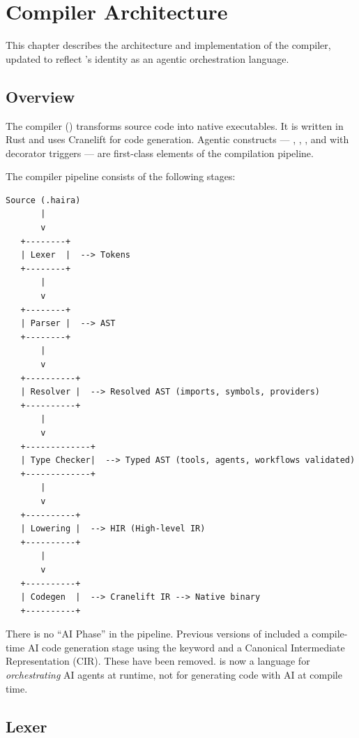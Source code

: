 \chapter{Compiler Architecture}
\label{ch:compiler}

This chapter describes the architecture and implementation of the \haira{} compiler, updated to reflect \haira{}'s identity as an agentic orchestration language.

\section{Overview}

The \haira{} compiler () transforms source code into native executables. It is written in Rust and uses Cranelift for code generation. Agentic constructs --- , , , and  with  decorator triggers --- are first-class elements of the compilation pipeline.

The compiler pipeline consists of the following stages:

\begin{lstlisting}[language={},numbers=none]
Source (.haira)
       |
       v
   +--------+
   | Lexer  |  --> Tokens
   +--------+
       |
       v
   +--------+
   | Parser |  --> AST
   +--------+
       |
       v
   +----------+
   | Resolver |  --> Resolved AST (imports, symbols, providers)
   +----------+
       |
       v
   +-------------+
   | Type Checker|  --> Typed AST (tools, agents, workflows validated)
   +-------------+
       |
       v
   +----------+
   | Lowering |  --> HIR (High-level IR)
   +----------+
       |
       v
   +----------+
   | Codegen  |  --> Cranelift IR --> Native binary
   +----------+
\end{lstlisting}

\begin{note}
There is no ``AI Phase'' in the pipeline. Previous versions of \haira{} included a compile-time AI code generation stage using the  keyword and a Canonical Intermediate Representation (CIR). These have been removed. \haira{} is now a language for \emph{orchestrating} AI agents at runtime, not for generating code with AI at compile time.
\end{note}

\section{Lexer}

